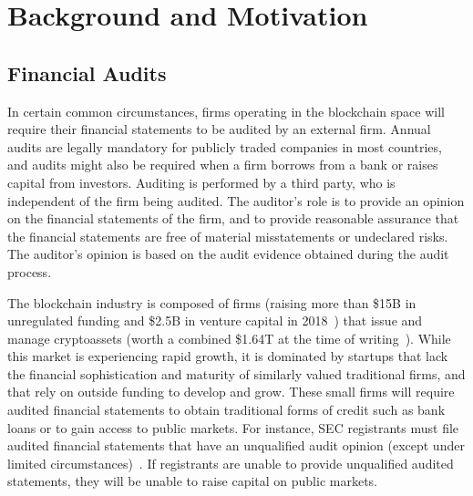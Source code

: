 






\section{Background and Motivation} \label{sec:auditing:background}

\subsection{Financial Audits}

In certain common circumstances, firms operating in the blockchain space will require their financial statements to be audited by an external firm. Annual audits are legally mandatory for publicly traded companies in most countries, and audits might also be required when a firm borrows from a bank or raises capital from investors. Auditing is performed by a third party, who is independent of the firm being audited. The auditor's role is to provide an opinion on the financial statements of the firm, and to provide reasonable assurance that the financial statements are free of material misstatements or undeclared risks. The auditor's opinion is based on the audit evidence obtained during the audit process.

The blockchain industry is composed of firms (raising more than \$15B in unregulated funding and \$2.5B in venture capital in 2018~\cite{coindesk2018}) that issue and manage cryptoassets (worth a combined \$1.64T at the time of writing~\cite{coinmarketcap}). While this market is experiencing rapid growth, it is dominated by startups that lack the financial sophistication and maturity of similarly valued traditional firms, and that rely on outside funding to develop and grow. These small firms will require audited financial statements to obtain traditional forms of credit such as bank loans or to gain access to public markets. For instance, SEC registrants must file audited financial statements that have an unqualified audit opinion (except under limited circumstances)~\cite{securities2009financial}. If registrants are unable to provide unqualified audited statements, they will be unable to raise capital on public markets. 

